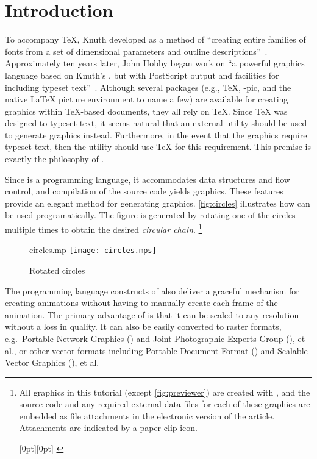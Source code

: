 \section{Introduction}
\label{sec:introduction}

To accompany \TeX{}, Knuth developed \MF{} as a method of ``creating
entire families of fonts from a set of dimensional parameters and
outline descriptions''~\cite{beebe:mf}.  Approximately ten years later,
John Hobby began work on \MP{}\Dash ``a powerful graphics language based
on Knuth's \MF, but with PostScript output and facilities for including
typeset text''~\cite{hobby:user}.  Although several packages (e.g.,
\PiC\TeX, \Xy-pic, and the native \LaTeX{} picture environment to name a
few) are available for creating graphics within \TeX-based documents,
they all rely on \TeX{}.  Since \TeX{} was designed to typeset text, it
seems natural that an external utility should be used to generate
graphics instead.  Furthermore, in the event that the graphics require
typeset text, then the utility should use \TeX{} for this requirement.
This premise is exactly the philosophy of \MP.

Since \MP{} is a programming language, it accommodates data structures
and flow control, and compilation of the \MP{} source code yields \EPS{}
graphics.  These features provide an elegant method for generating
graphics.  \autoref{fig:circles} illustrates how \MP{} can be used
programatically.  The figure is generated by rotating one of the circles
multiple times to obtain the desired \textit{circular chain}.%
\footnote{All graphics in this tutorial (except \autoref{fig:previewer})
  are created with \MP{}, and the source code and any required external
  data files for each of these graphics are embedded as file attachments
  in the electronic \PDF{} version of the article.  Attachments are
  indicated by a paper clip icon.

  \vspace{-\baselineskip}
  \noindent%
  \raisebox{0pt}[0pt][0pt]{%
    \makebox[0pt][r]{%
      \notextattachfile{\paperclip}%
      \hspace*{\marginparsep}%
    }%
  }%
}

\begin{figure}
  \begin{withattachment}{circles.mp}
    \centering
    \texttt{[image: circles.mps]}
  \end{withattachment}
  \caption{Rotated circles}
  \label{fig:circles}
\end{figure}

The programming language constructs of \MP{} also deliver a graceful
mechanism for creating animations without having to manually create each
frame of the animation.  The primary advantage of \EPS{} is that it can
be scaled to any resolution without a loss in quality.  It can also be
easily converted to raster formats, e.g.\ Portable Network Graphics
(\PNG) and Joint Photographic Experts Group (\JPEG), et al., or other
vector formats including Portable Document Format (\PDF) and Scalable
Vector Graphics (\SVG), et al.
